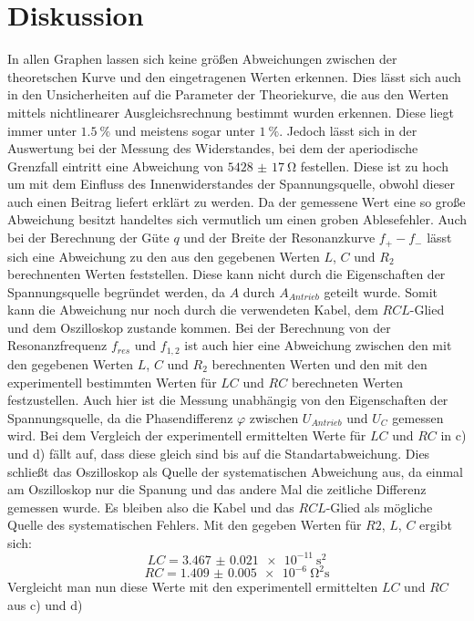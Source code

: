 \section{Diskussion}
\label{sec:Diskussion}

In allen Graphen lassen sich keine größen Abweichungen zwischen der theoretschen Kurve und den eingetragenen Werten erkennen. Dies lässt sich auch in den Unsicherheiten auf die Parameter der Theoriekurve, die aus den Werten mittels nichtlinearer Ausgleichsrechnung bestimmt wurden erkennen. Diese liegt immer unter $\SI{1.5}{\percent}$ und meistens sogar unter $\SI{1}{\percent}$. Jedoch lässt sich in der Auswertung bei der Messung des Widerstandes, bei dem der aperiodische Grenzfall eintritt eine Abweichung von $\SI{5428(17)}{\ohm}$ festellen. Diese ist zu hoch um mit dem Einfluss des Innenwiderstandes der Spannungsquelle, obwohl dieser auch einen Beitrag liefert erklärt zu werden. Da der gemessene Wert eine so große Abweichung besitzt handeltes sich vermutlich um einen groben Ablesefehler. Auch bei der Berechnung der Güte $q$ und der Breite der Resonanzkurve $f_+ - f_-$ lässt sich eine Abweichung zu den aus den gegebenen Werten $L$, $C$ und $R_2$ berechnenten Werten feststellen. Diese kann nicht durch die Eigenschaften der Spannungsquelle begründet werden, da $A$ durch $A_{Antrieb}$ geteilt wurde. Somit kann die Abweichung nur noch durch die verwendeten Kabel, dem $RCL$-Glied und dem Oszilloskop zustande kommen. Bei der Berechnung von der Resonanzfrequenz $f_{res}$ und $f_{1,2}$ ist auch hier eine Abweichung zwischen den mit den gegebenen Werten $L$, $C$ und $R_2$ berechnenten Werten und den mit den experimentell bestimmten Werten für $LC$ und $RC$ berechneten Werten festzustellen. Auch hier ist die Messung unabhängig von den Eigenschaften der Spannungsquelle, da die Phasendifferenz $\varphi$ zwischen $U_{Antrieb}$ und $U_C$ gemessen wird. Bei dem Vergleich der experimentell ermittelten Werte für $LC$ und $RC$ in c) und d) fällt auf, dass diese gleich sind bis auf die Standartabweichung. Dies schließt das Oszilloskop als Quelle der systematischen Abweichung aus, da einmal am Oszilloskop nur die Spanung und das andere Mal die zeitliche Differenz gemessen wurde. Es bleiben also die Kabel und das $RCL$-Glied als mögliche Quelle des systematischen Fehlers. Mit den gegeben Werten für $R2$, $L$, $C$ ergibt sich:
\begin{displaymath}
LC = \SI{3.467(21)e-11}{\second\squared}
\end{displaymath}
\begin{displaymath}
RC = \SI{1.409(5)e-6}{\ohm\squared\second}
\end{displaymath} 
Vergleicht man nun diese Werte mit den experimentell ermittelten $LC$ und $RC$ aus c) und d) 







	
